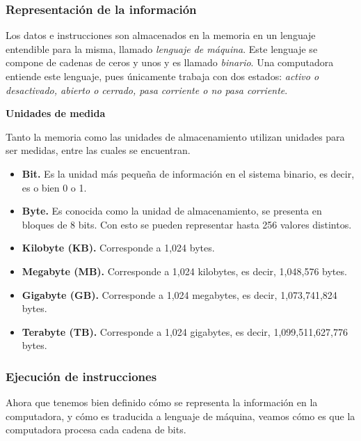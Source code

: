 \documentclass[11pt,spanish]{article}
\begin{document}
\subsubsection*{Representación de la información}

Los datos e instrucciones son almacenados en la memoria en un lenguaje
entendible para la misma, llamado \emph{lenguaje de máquina}. Este
lenguaje se compone de cadenas de ceros y unos y es llamado \emph{binario}.
Una computadora entiende este lenguaje, pues únicamente trabaja con
dos estados: \emph{activo o desactivado, abierto o cerrado, pasa corriente
o no pasa corriente}. 

\bigskip{}

\textbf{Unidades de medida}

Tanto la memoria como las unidades de almacenamiento utilizan unidades
para ser medidas, entre las cuales se encuentran.
\begin{itemize}
\item \textbf{Bit.} Es la unidad más pequeña de información en el sistema
binario, es decir, es o bien 0 o 1.
\item \textbf{Byte.} Es conocida como la unidad de almacenamiento, se presenta
en bloques de 8 bits. Con esto se pueden representar hasta 256 valores
distintos. 
\item \textbf{Kilobyte (KB).} Corresponde a 1,024 bytes.
\item \textbf{Megabyte (MB).} Corresponde a 1,024 kilobytes, es decir, 1,048,576
bytes.
\item \textbf{Gigabyte (GB). }Corresponde a 1,024 megabytes, es decir, 1,073,741,824
bytes.
\item \textbf{Terabyte (TB). }Corresponde a 1,024 gigabytes, es decir, 1,099,511,627,776
bytes.
\end{itemize}

\subsubsection*{Ejecución de instrucciones}

Ahora que tenemos bien definido cómo se representa la información
en la computadora, y cómo es traducida a lenguaje de máquina, veamos
cómo es que la computadora procesa cada cadena de bits.
\end{document}
